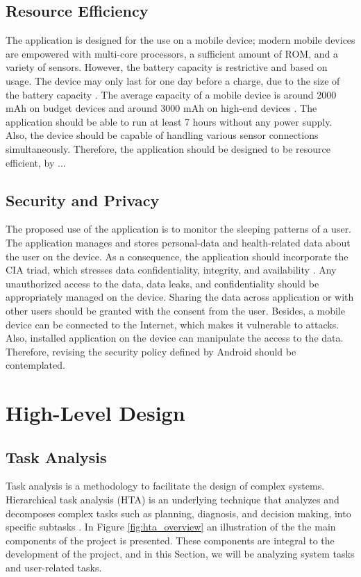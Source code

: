 \subsection{Resource Efficiency}
The application is designed for the use on a mobile device; modern mobile devices are empowered with multi-core processors, a sufficient amount of ROM, and a variety of sensors. However, the battery capacity is restrictive and based on usage. The device may only last for one day before a charge, due to the size of the battery capacity \cite{androidbattery}. The average capacity of a mobile device is around 2000 mAh on budget devices and around 3000 mAh on high-end devices \cite{androidbatteryavg}. The application should be able to run at least 7 hours without any power supply. Also, the device should be capable of handling various sensor connections simultaneously. Therefore, the application should be designed to be resource efficient, by ... 

\subsection{Security and Privacy}
The proposed use of the application is to monitor the sleeping patterns of a user. The application manages and stores personal-data and health-related data about the user on the device. As a consequence, the application should incorporate the CIA triad, which stresses data confidentiality, integrity, and availability \cite{cia}. Any unauthorized access to the data, data leaks, and confidentiality should be appropriately managed on the device. Sharing the data across application or with other users should be granted with the consent from the user.  Besides, a mobile device can be connected to the Internet, which makes it vulnerable to attacks. Also, installed application on the device can manipulate the access to the data. Therefore, revising the security policy defined by Android \cite{androidsecurity} should be contemplated. 

\section{High-Level Design}

\subsection{Task Analysis}
Task analysis is a methodology to facilitate the design of complex systems. Hierarchical task analysis (HTA) is an underlying technique that analyzes and decomposes complex tasks such as planning, diagnosis, and decision making, into specific subtasks \cite{ta}. In Figure \ref{fig:hta_overview} an illustration of the the main components of the project is presented. These components are integral to the development of the project, and in this Section, we will be analyzing system tasks and user-related tasks.

